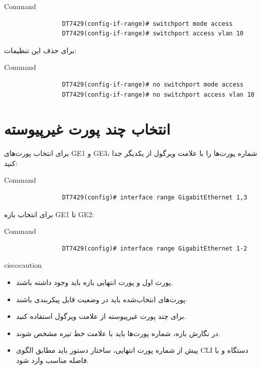 \documentclass[11pt,letterpaper]{report}
\newenvironment{cautionbox}[1]{%
	\begin{noticebox}[title={\textbf{\faExclamationTriangle\ #1}}]{ciscocaution}
	}{%
	\end{noticebox}
}
\begin{document}
		\begin{latin}
			\begin{cliexample}{Command}
				\begin{verbatim}
				DT7429(config-if-range)# switchport mode access
				DT7429(config-if-range)# switchport access vlan 10
				\end{verbatim}
			\end{cliexample}
		\end{latin}

		برای حذف این تنظیمات:

		\begin{latin}
			\begin{cliexample}{Command}
				\begin{verbatim}
				DT7429(config-if-range)# no switchport mode access
				DT7429(config-if-range)# no switchport access vlan 10
				\end{verbatim}
			\end{cliexample}
		\end{latin}

		\section{انتخاب چند پورت غیرپیوسته}

		برای انتخاب پورت‌های GE1 و GE3، شماره پورت‌ها را با علامت ویرگول
		از یکدیگر جدا کنید:

		\begin{latin}
			\begin{cliexample}{Command}
				\begin{verbatim}
				DT7429(config)# interface range GigabitEthernet 1,3
				\end{verbatim}
			\end{cliexample}
		\end{latin}

		برای انتخاب بازه GE1 تا GE2:

		\begin{latin}
			\begin{cliexample}{Command}
				\begin{verbatim}
				DT7429(config)# interface range GigabitEthernet 1-2
				\end{verbatim}
			\end{cliexample}
		\end{latin}

		\begin{cautionbox}{نکات استفاده از Interface Range}
			\begin{itemize}
				\item پورت اول و پورت انتهایی بازه باید وجود داشته باشند.
				\item پورت‌های انتخاب‌شده باید در وضعیت قابل پیکربندی باشند.
				\item برای چند پورت غیرپیوسته از علامت ویرگول استفاده کنید.
				\item در نگارش بازه، شماره پورت‌ها باید با علامت خط تیره
				مشخص شوند.
				\item پیش از شماره پورت انتهایی، ساختار دستور باید مطابق
				الگوی CLI دستگاه و با فاصله مناسب وارد شود.
			\end{itemize}
		\end{cautionbox}
\end{document}
